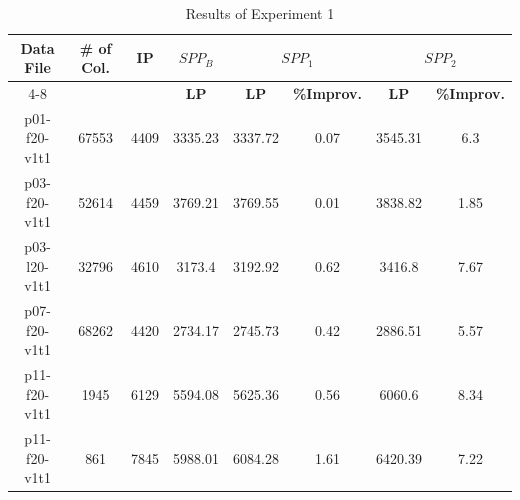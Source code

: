 \begin{table}[h]
\centering
\caption{Results of Experiment 1}\label{part1:lpbounds-gr1}
\begin {tabular}[t]{|c|c|c|c|c|c|c|c|}  
\hline
{\bf Data File} & {\bf \# of Col.} & {\bf IP} & {\bf $SPP_B$}& \multicolumn{2}{|c|}{{\bf $SPP_1$}} & \multicolumn{2}{|c|}{{\bf $SPP_2$}}\\ \cline {4-8}
\mbox{} &  \mbox{} &  \mbox{} &  {\bf LP} & {\bf LP} & {\bf \%Improv.} & {\bf LP} & {\bf \%Improv.} \\\hline
p01-f20-v1t1	&	67553	&	4409	&	3335.23	&	3337.72	&	0.07	&	3545.31	&	6.3	\\
p03-f20-v1t1	&	52614	&	4459	&	3769.21	&	3769.55	&	0.01	&	3838.82	&	1.85	\\
p03-l20-v1t1	&	32796	&	4610	&	3173.4	&	3192.92	&	0.62	&	3416.8	&	7.67	\\
p07-f20-v1t1	&	68262	&	4420	&	2734.17	&	2745.73	&	0.42	&	2886.51	&	5.57	\\
p11-f20-v1t1	&	1945	&	6129	&	5594.08	&	5625.36	&	0.56	&	6060.6	&	8.34	\\
p11-f20-v1t1	&	861	&	7845	&	5988.01	&	6084.28	&	1.61	&	6420.39	&	7.22	\\\hline
\end{tabular}
\end{table} 

